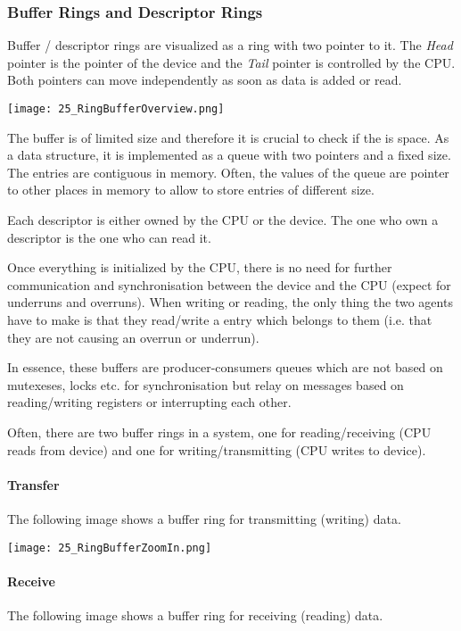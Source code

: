 \subsubsection{Buffer Rings and Descriptor Rings}
Buffer / descriptor rings are visualized as a ring with two pointer to it. The \textit{Head} pointer is the pointer of the device and the \textit{Tail} pointer is controlled by the CPU. Both pointers can move independently as soon as data is added or read.

\texttt{[image: 25\_RingBufferOverview.png]}

The buffer is of limited size and therefore it is crucial to check if the is space. As a data structure, it is implemented as a queue with two pointers and a fixed size. The entries are contiguous in memory. Often, the values of the queue are pointer to other places in memory to allow to store entries of different size.

Each descriptor is either owned by the CPU or the device. The one who own a descriptor is the one who can read it.

Once everything is initialized by the CPU, there is no need for further communication and synchronisation between the device and the CPU (expect for underruns and overruns). When writing or reading, the only thing the two agents have to make is that they read/write a entry which belongs to them (i.e. that they are not causing an overrun or underrun).

In essence, these buffers are producer-consumers queues which are not based on mutexeses, locks etc. for synchronisation but relay on messages based on reading/writing registers or interrupting each other.

Often, there are two buffer rings in a system, one for reading/receiving (CPU reads from device) and one for writing/transmitting (CPU writes to device).

\paragraph{Transfer}
The following image shows a buffer ring for transmitting (writing) data.

\texttt{[image: 25\_RingBufferZoomIn.png]}

\paragraph{Receive}
The following image shows a buffer ring for receiving (reading) data.

